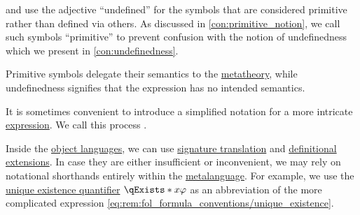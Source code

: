 \begin{remark}\label{rem:undefined_and_primitive_terms}
  \textcite[v]{WhiteheadRussell1927PrincipiaMathematicaVol1} and \textcite[28]{Kleene1971Metamathematics} use the adjective \enquote{undefined} for the symbols that are considered primitive rather than defined via others. As discussed in \cref{con:primitive_notion}, we call such symbols \enquote{primitive} to prevent confusion with the notion of undefinedness which we present in \cref{con:undefinedness}.

  Primitive symbols delegate their semantics to the \hyperref[con:metalogic]{metatheory}, while undefinedness signifies that the expression has no intended semantics.
\end{remark}

\begin{concept}\label{con:syntactic_abbreviation}\mimprovised
  It is sometimes convenient to introduce a simplified notation for a more intricate \hyperref[con:expression]{expression}. We call this process .

  Inside the \hyperref[con:metalanguage]{object languages}, we can use \hyperref[def:fol_signature_category/morphisms]{signature translation} and \hyperref[def:fol_definition]{definitional extensions}. In case they are either insufficient or inconvenient, we may rely on notational shorthands entirely within the \hyperref[con:metalanguage]{metalanguage}. For example, we use the \hyperref[con:description_operator/unique_existence]{unique existence quantifier} \( \qExists* x \varphi \) as an abbreviation of the more complicated expression \eqref{eq:rem:fol_formula_conventions/unique_existence}.
\end{concept}

